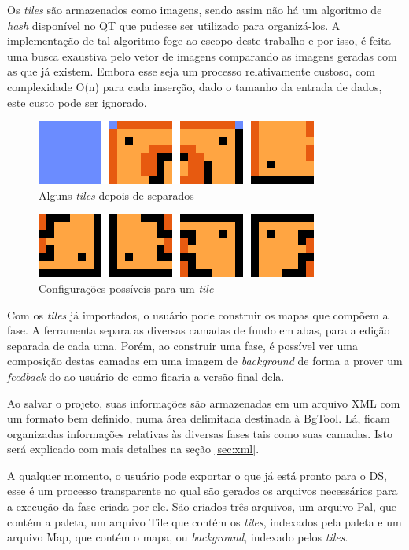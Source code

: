\documentclass[brazil]{abnt}
\begin{document}
Os \textit{tiles} são armazenados como imagens, sendo assim não há um algoritmo de \textit{hash} disponível no QT que pudesse ser utilizado para organizá-los. A implementação de tal algoritmo foge ao escopo deste trabalho e por isso, é feita uma busca exaustiva pelo vetor de imagens comparando as imagens geradas com as que já existem. Embora esse seja um processo relativamente custoso, com complexidade O(n) para cada inserção, dado o tamanho da entrada de dados, este custo pode ser ignorado.

\begin{figure}[h!]
\centering
\includegraphics[scale=1]{imgs/tiles1.png}
\caption{Alguns \textit{tiles} depois de separados}
\label{fig:tiles1}
\end{figure}

\begin{figure}[h!]
\centering
\includegraphics[scale=1]{imgs/tiles2.png}
\caption{Configurações possíveis para um \textit{tile}}
\label{fig:tiles2}
\end{figure}

Com os \textit{tiles} já importados, o usuário pode construir os mapas que compõem a fase. A ferramenta separa as diversas camadas de fundo em abas, para a edição separada de cada uma. Porém, ao construir uma fase, é possível ver uma composição destas camadas em uma imagem de \textit{background} de forma a prover um \textit{feedback} do ao usuário de como ficaria a versão final dela.

Ao salvar o projeto, suas informações são armazenadas em um arquivo XML com um formato bem definido, numa área delimitada destinada à BgTool. Lá, ficam organizadas informações relativas às diversas fases tais como suas camadas. Isto será explicado com mais detalhes na seção \ref{sec:xml}.

A qualquer momento, o usuário pode exportar o que já está pronto para o DS, esse é um processo transparente no qual são gerados os arquivos necessários para a execução da fase criada por ele. São criados três arquivos, um arquivo Pal, que contém a paleta, um arquivo Tile que contém os \textit{tiles}, indexados pela paleta e um arquivo Map, que contém o mapa, ou \textit{background}, indexado pelos \textit{tiles}.
\end{document}
